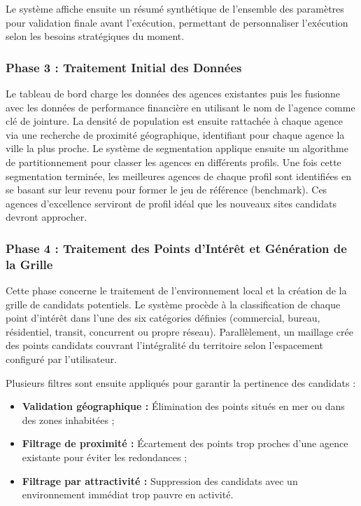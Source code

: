 \documentclass[11pt,a4paper,twoside]{report}
\begin{document}
Le système affiche ensuite un résumé synthétique de l'ensemble des paramètres pour validation finale avant l'exécution, permettant de personnaliser l'exécution selon les besoins stratégiques du moment.

\subsubsection*{Phase 3 : Traitement Initial des Données}

Le tableau de bord charge les données des agences existantes puis les fusionne avec les données de performance financière en utilisant le nom de l'agence comme clé de jointure. La densité de population est ensuite rattachée à chaque agence via une recherche de proximité géographique, identifiant pour chaque agence la ville la plus proche. Le système de segmentation applique ensuite un algorithme de partitionnement pour classer les agences en différents profils. Une fois cette segmentation terminée, les meilleures agences de chaque profil sont identifiées en se basant sur leur revenu pour former le jeu de référence (benchmark). Ces agences d'excellence serviront de profil idéal que les nouveaux sites candidats devront approcher.

\subsubsection*{Phase 4 : Traitement des Points d'Intérêt et Génération de la Grille}

Cette phase concerne le traitement de l'environnement local et la création de la grille de candidats potentiels. Le système procède à la classification de chaque point d'intérêt dans l'une des six catégories définies (commercial, bureau, résidentiel, transit, concurrent ou propre réseau). Parallèlement, un maillage crée des points candidats couvrant l'intégralité du territoire selon l'espacement configuré par l'utilisateur.

Plusieurs filtres sont ensuite appliqués pour garantir la pertinence des candidats :

\begin{itemize}[leftmargin=1.2cm]
    \item \textbf{Validation géographique :} Élimination des points situés en mer ou dans des zones inhabitées ;
    \item \textbf{Filtrage de proximité :} Écartement des points trop proches d'une agence existante pour éviter les redondances ;
    \item \textbf{Filtrage par attractivité :} Suppression des candidats avec un environnement immédiat trop pauvre en activité.
\end{itemize}
\end{document}
